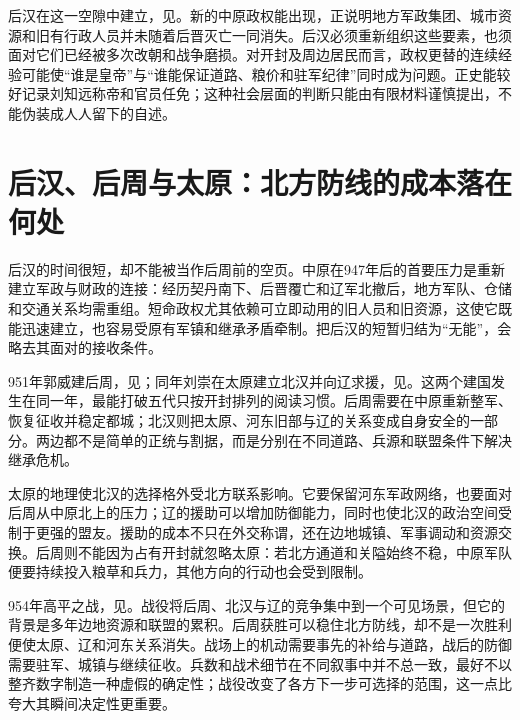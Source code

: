 后汉在这一空隙中建立，见。新的中原政权能出现，正说明地方军政集团、城市资源和旧有行政人员并未随着后晋灭亡一同消失。后汉必须重新组织这些要素，也须面对它们已经被多次改朝和战争磨损。对开封及周边居民而言，政权更替的连续经验可能使“谁是皇帝”与“谁能保证道路、粮价和驻军纪律”同时成为问题。正史能较好记录刘知远称帝和官员任免；这种社会层面的判断只能由有限材料谨慎提出，不能伪装成人人留下的自述。

\section{后汉、后周与太原：北方防线的成本落在何处}

后汉的时间很短，却不能被当作后周前的空页。中原在947年后的首要压力是重新建立军政与财政的连接：经历契丹南下、后晋覆亡和辽军北撤后，地方军队、仓储和交通关系均需重组。短命政权尤其依赖可立即动用的旧人员和旧资源，这使它既能迅速建立，也容易受原有军镇和继承矛盾牵制。把后汉的短暂归结为“无能”，会略去其面对的接收条件。

951年郭威建后周，见；同年刘崇在太原建立北汉并向辽求援，见。这两个建国发生在同一年，最能打破五代只按开封排列的阅读习惯。后周需要在中原重新整军、恢复征收并稳定都城；北汉则把太原、河东旧部与辽的关系变成自身安全的一部分。两边都不是简单的正统与割据，而是分别在不同道路、兵源和联盟条件下解决继承危机。

太原的地理使北汉的选择格外受北方联系影响。它要保留河东军政网络，也要面对后周从中原北上的压力；辽的援助可以增加防御能力，同时也使北汉的政治空间受制于更强的盟友。援助的成本不只在外交称谓，还在边地城镇、军事调动和资源交换。后周则不能因为占有开封就忽略太原：若北方通道和关隘始终不稳，中原军队便要持续投入粮草和兵力，其他方向的行动也会受到限制。

954年高平之战，见。战役将后周、北汉与辽的竞争集中到一个可见场景，但它的背景是多年边地资源和联盟的累积。后周获胜可以稳住北方防线，却不是一次胜利便使太原、辽和河东关系消失。战场上的机动需要事先的补给与道路，战后的防御需要驻军、城镇与继续征收。兵数和战术细节在不同叙事中并不总一致，最好不以整齐数字制造一种虚假的确定性；战役改变了各方下一步可选择的范围，这一点比夸大其瞬间决定性更重要。

